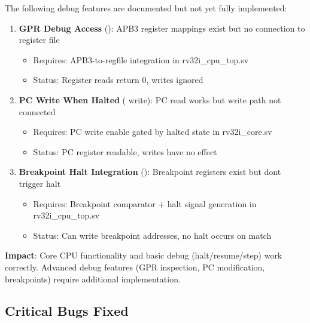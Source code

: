 \begin{record}

The following debug features are documented but not yet fully
implemented:

\begin{enumerate}
\def\labelenumi{\arabic{enumi}.}
\item
  \textbf{GPR Debug Access} (): APB3 register mappings
  exist but no connection to register file

  \begin{itemize}
  \tightlist
  \item
    Requires: APB3-to-regfile integration in
    rv32i\_\allowbreak{}cpu\_\allowbreak{}top.sv
  \item
    Status: Register reads return 0, writes ignored
  \end{itemize}
\item
  \textbf{PC Write When Halted} ( write): PC read works but
  write path not connected

  \begin{itemize}
  \tightlist
  \item
    Requires: PC write enable gated by halted state in
    rv32i\_\allowbreak{}core.sv
  \item
    Status: PC register readable, writes have no effect
  \end{itemize}
\item
  \textbf{Breakpoint Halt Integration} (): Breakpoint
  registers exist but don\textquotesingle t trigger halt

  \begin{itemize}
  \tightlist
  \item
    Requires: Breakpoint comparator + halt signal generation in
    rv32i\_\allowbreak{}cpu\_\allowbreak{}top.sv
  \item
    Status: Can write breakpoint addresses, no halt occurs on match
  \end{itemize}
\end{enumerate}

\textbf{Impact}: Core CPU functionality and basic debug
(halt/\allowbreak{}resume/\allowbreak{}step) work correctly. Advanced
debug features (GPR inspection, PC modification, breakpoints) require
additional implementation.

\end{record}

\subsection{\texorpdfstring{Critical Bugs Fixed
\ok{}}{Critical Bugs Fixed }}\label{cr:fix:cpu-verification-ready:critical-bugs-fixed-white-check-mark}

